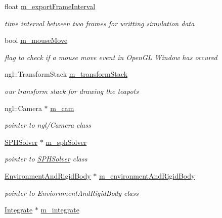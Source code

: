\begin{DoxyCompactItemize}
float \hyperlink{class_g_l_window_a0d249b475e8b0bc7e7daaf070d1f473c}{m\_\-exportFrameInterval}
\begin{DoxyCompactList}\small\item\em time interval between two frames for writting simulation data \item\end{DoxyCompactList}\item 
bool \hyperlink{class_g_l_window_ae4897ca15316a71abfd7cbd3c44e7536}{m\_\-mouseMove}
\begin{DoxyCompactList}\small\item\em flag to check if a mouse move event in OpenGL Window has occured \item\end{DoxyCompactList}\item 
ngl::TransformStack \hyperlink{class_g_l_window_aaa941adbe7772d03588f312326100e5f}{m\_\-transformStack}
\begin{DoxyCompactList}\small\item\em our transform stack for drawing the teapots \item\end{DoxyCompactList}\item 
ngl::Camera $\ast$ \hyperlink{class_g_l_window_a55556dafb4fc86c35b270ca0d68f456e}{m\_\-cam}
\begin{DoxyCompactList}\small\item\em pointer to ngl/Camera class \item\end{DoxyCompactList}\item 
\hyperlink{class_s_p_h_solver}{SPHSolver} $\ast$ \hyperlink{class_g_l_window_a0176eab25515853a18867ca37578ee3b}{m\_\-sphSolver}
\begin{DoxyCompactList}\small\item\em pointer to \hyperlink{class_s_p_h_solver}{SPHSolver} class \item\end{DoxyCompactList}\item 
\hyperlink{class_environment_and_rigid_body}{EnvironmentAndRigidBody} $\ast$ \hyperlink{class_g_l_window_a717436a026021c137c6b0963c0d8fc49}{m\_\-environmentAndRigidBody}
\begin{DoxyCompactList}\small\item\em pointer to EnviornmentAndRigidBody class \item\end{DoxyCompactList}\item 
\hyperlink{class_integrate}{Integrate} $\ast$ \hyperlink{class_g_l_window_ad6c4fad61e643038bdf0d6bdb0fc1978}{m\_\-integrate}

\end{DoxyCompactItemize}
